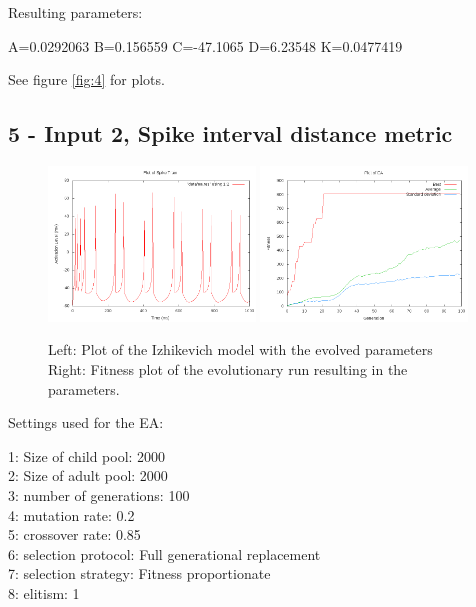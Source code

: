 \documentclass[11pt]{article}
\begin{document}
Resulting parameters:

A=0.0292063 B=0.156559 C=-47.1065 D=6.23548 K=0.0477419

See figure \ref{fig:4} for plots.

\subsection*{5 - Input 2, Spike interval distance metric}

\begin{figure}
\begin{center}
\mbox{\includegraphics[width=0.49\textwidth]{images/5-res.png}}
\mbox{\includegraphics[width=0.49\textwidth]{images/5-fit.png}}
\end{center}
\caption{Left: Plot of the Izhikevich model with the evolved parameters\\
Right: Fitness plot of the evolutionary run resulting in the parameters.}
\label{fig:5}
\end{figure}

Settings used for the EA:

1: Size of child pool: 2000\\
2: Size of adult pool: 2000\\
3: number of generations: 100\\
4: mutation rate: 0.2\\
5: crossover rate: 0.85\\
6: selection protocol: Full generational replacement\\
7: selection strategy: Fitness proportionate\\
8: elitism: 1\\
\end{document}
